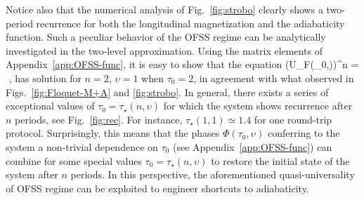 Notice also that the numerical analysis of Fig.~\ref{fig:strobo} clearly shows a two-period recurrence for both the longitudinal magnetization and the adiabaticity function. Such a peculiar behavior of the OFSS regime can be analytically investigated in the two-level approximation. Using the matrix elements of Appendix~\ref{app:OFSS-func}, it is easy to show that the equation
\be
(U_F(\tau_0,\upsilon))^n =  \,\,,
\ee
has solution for $n=2$, $\upsilon=1$ when $\tau_0= 2$, in agreement with what observed in Figs.~\ref{fig:Floquet-M+A} and \ref{fig:strobo}. In general, there exists a series of exceptional values of $\tau_0=\tau_\star(n,\upsilon)$ for which the system shows recurrence after $n$ periods, see Fig.~\ref{fig:rec}. For instance, $\tau_\star(1,1)\simeq 1.4$ for one round-trip protocol. Surprisingly, this means that the phases $\Phi(\tau_0,\upsilon)$ conferring to the system a non-trivial dependence on $\tau_0$ (see Appendix~\ref{app:OFSS-func}) can combine for some special values $\tau_0=\tau_\star(n,\upsilon)$ to restore the initial state of the system after $n$ periods. In this perspective, the aforementioned quasi-universality of OFSS regime can be exploited to engineer shortcuts to adiabaticity.




